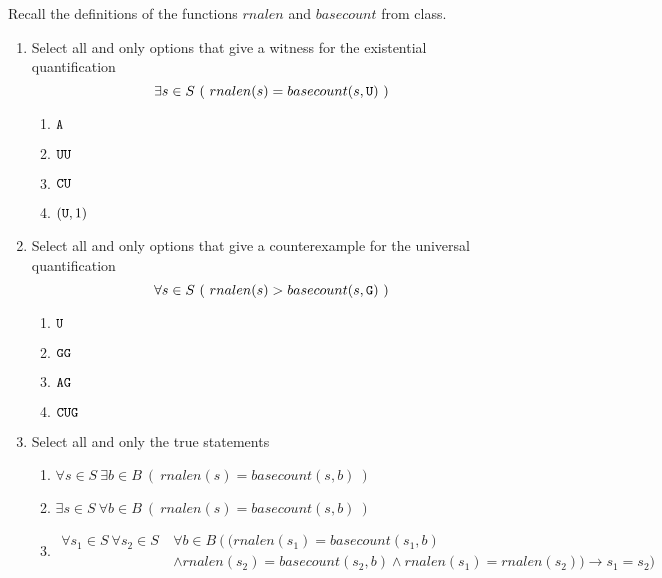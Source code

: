 
Recall the definitions of the functions $rnalen$ and $basecount$ from class.

\begin{enumerate}
    \item Select all and only options that give a witness for the existential quantification
    $$\exists s \in S ~(~rnalen(s) = basecount(s,\texttt{U})~)$$
    \begin{enumerate}
    \item $\texttt{A}$
    \item $\texttt{U}\texttt{U}$
    \item $\texttt{C}\texttt{U}$
    \item $(\texttt{U}, 1)$
    \end{enumerate}
    
    \item Select all and only options that give a counterexample for the universal quantification
    $$\forall s \in S ~(~rnalen(s) > basecount(s,\texttt{G})~)$$
    \begin{enumerate}
    \item $\texttt{U}$
    \item $\texttt{G}\texttt{G}$
    \item $\texttt{A}\texttt{G}$
    \item $\texttt{C}\texttt{U}\texttt{G}$
    \end{enumerate}
    
    \item Select all and only the true statements
    \begin{enumerate}
    \item $\forall s \in S ~\exists b \in B ~\left(~rnalen(s) = basecount(s,b)~ \right)$
    \item $\exists s \in S ~\forall b \in B ~\left(~rnalen(s) = basecount(s,b)~ \right)$
    \item \begin{align*} \forall s_1 \in S~\forall s_2 \in S ~&\forall b \in B ~\big( ~\big( rnalen(s_1) = basecount(s_1,b) \\
    &\land rnalen(s_2) = basecount(s_2,b) \land rnalen(s_1) = rnalen(s_2) \big) \to s_1 = s_2  \big)\end{align*}
    \end{enumerate}
    
\end{enumerate}